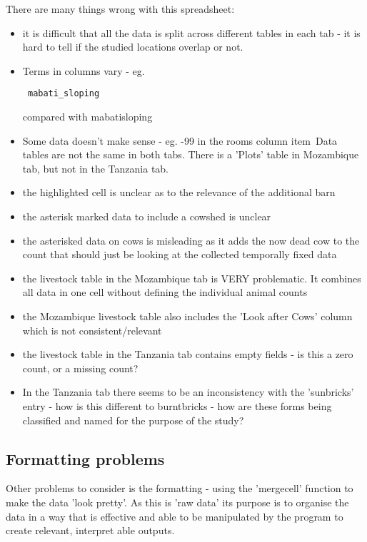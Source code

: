 \documentclass{article}
\begin{document}
There are many things wrong with this spreadsheet:
\begin{itemize}
    \item it is difficult that all the data is split across different tables in each tab - it is hard to tell if the studied locations overlap or not. 
    \item Terms in columns vary - eg. \begin{verbatim} mabati_sloping
    \end{verbatim} compared with mabatisloping
    \item Some data doesn't make sense - eg. -99 in the rooms column
    item\ Data tables are not the same in both tabs. There is a 'Plots' table in Mozambique tab, but not in the Tanzania tab.
    \item the highlighted cell is unclear as to the relevance of the additional barn
    \item the asterisk marked data to include a cowshed is unclear
    \item the asterisked data on cows is misleading as it adds the now dead cow to the count that should just be looking at the collected temporally fixed data
    \item the livestock table in the Mozambique tab is VERY problematic. It combines all data in one cell without defining the individual animal counts
    \item the Mozambique livestock table also includes the 'Look after Cows' column which is not consistent/relevant
    \item the livestock table in the Tanzania tab contains empty fields - is this a zero count, or a missing count?
    \item In the Tanzania tab there seems to be an inconsistency with the 'sunbricks' entry - how is this different to burntbricks - how are these forms being classified and named for the purpose of the study?
    \end{itemize}

\subsection{Formatting problems}

Other problems to consider is the formatting - using the 'mergecell' function to make the data 'look pretty'.
As this is 'raw data' its purpose is to organise the data in a way that is effective and able to be manipulated by the program to create relevant, interpret able outputs. 
\end{document}
